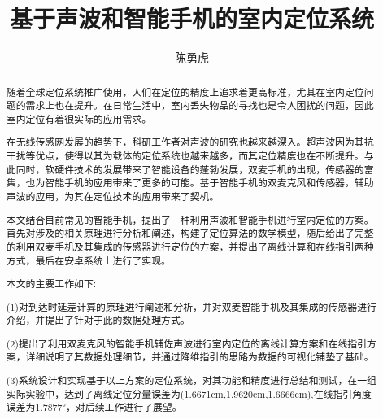 \documentclass[winfonts]{njuthesis}
\title{基于声波和智能手机的室内定位系统}
\author{陈勇虎}
\begin{document}
\maketitle

\begin{abstract}
	
	随着全球定位系统推广使用，人们在定位的精度上追求着更高标准，尤其在室内定位问题的需求上也在提升。在日常生活中，室内丢失物品的寻找也是令人困扰的问题，因此室内定位有着很实际的应用需求。
	
	在无线传感网发展的趋势下，科研工作者对声波的研究也越来越深入。超声波因为其抗干扰等优点，使得以其为载体的定位系统也越来越多，而其定位精度也在不断提升。与此同时，软硬件技术的发展带来了智能设备的蓬勃发展，双麦手机的出现，传感器的富集，也为智能手机的应用带来了更多的可能。基于智能手机的双麦克风和传感器，辅助声波的应用，为其在定位技术的应用带来了契机。
	
	本文结合目前常见的智能手机，提出了一种利用声波和智能手机进行室内定位的方案。首先对涉及的相关原理进行分析和阐述，构建了定位算法的数学模型，随后给出了完整的利用双麦手机及其集成的传感器进行定位的方案，并提出了离线计算和在线指引两种方式，最后在安卓系统上进行了实现。
	
	本文的主要工作如下:
	
	(1)对到达时延差计算的原理进行阐述和分析，并对双麦智能手机及其集成的传感器进行介绍，并提出了针对于此的数据处理方式。
	
	(2)提出了利用双麦克风的智能手机辅佐声波进行室内定位的离线计算方案和在线指引方案，详细说明了其数据处理细节，并通过降维指引的思路为数据的可视化铺垫了基础。
	
	(3)系统设计和实现基于以上方案的定位系统，对其功能和精度进行总结和测试，在一组实际实验中，达到了离线定位分量误差为(1.6671cm,1.9620cm,1.6666cm),在线指引角度误差为1.7877°，对后续工作进行了展望。

\end{abstract}
\end{document}
